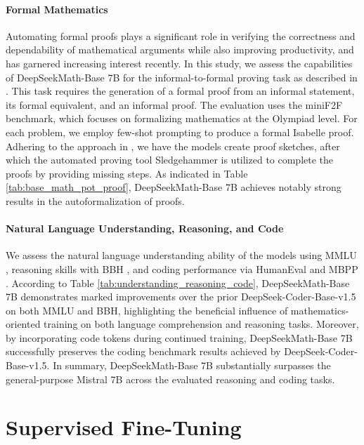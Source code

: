 \begin{itemize}[topsep=0pt]
\paragraph{Formal Mathematics}

Automating formal proofs plays a significant role in verifying the correctness and dependability of mathematical arguments while also improving productivity, and has garnered increasing interest recently. In this study, we assess the capabilities of DeepSeekMath-Base 7B for the informal-to-formal proving task as described in \citep{dsp_proof}. This task requires the generation of a formal proof from an informal statement, its formal equivalent, and an informal proof. The evaluation uses the miniF2F \citep{minif2f} benchmark, which focuses on formalizing mathematics at the Olympiad level. For each problem, we employ few-shot prompting to produce a formal Isabelle proof. Adhering to the approach in \cite{dsp_proof}, we have the models create proof sketches, after which the automated proving tool Sledgehammer \citep{sledgehammer} is utilized to complete the proofs by providing missing steps. As indicated in Table \ref{tab:base_math_pot_proof}, DeepSeekMath-Base 7B achieves notably strong results in the autoformalization of proofs.

\paragraph{Natural Language Understanding, Reasoning, and Code}

We assess the natural language understanding ability of the models using MMLU \citep{mmlu}, reasoning skills with BBH \citep{bbh}, and coding performance via HumanEval \citep{codex} and MBPP \citep{mbpp}. According to Table \ref{tab:understanding_reasoning_code}, DeepSeekMath-Base 7B demonstrates marked improvements over the prior DeepSeek-Coder-Base-v1.5 \citep{deepseek-coder} on both MMLU and BBH, highlighting the beneficial influence of mathematics-oriented training on both language comprehension and reasoning tasks. Moreover, by incorporating code tokens during continued training, DeepSeekMath-Base 7B successfully preserves the coding benchmark results achieved by DeepSeek-Coder-Base-v1.5. In summary, DeepSeekMath-Base 7B substantially surpasses the general-purpose Mistral 7B \citep{mistral} across the evaluated reasoning and coding tasks.

\section{Supervised Fine-Tuning}


\end{itemize}
